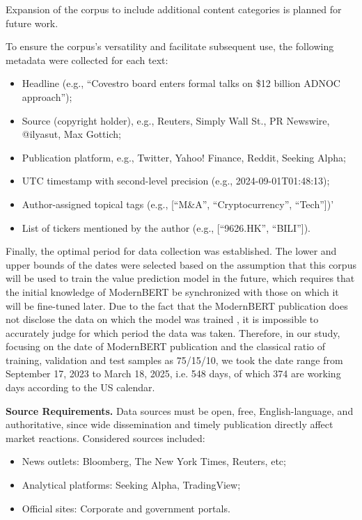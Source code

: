 Expansion of the corpus to include additional content categories is planned for future work.

To ensure the corpus's versatility and facilitate subsequent use, the following metadata were collected for each text:

\begin{itemize}
    \item Headline (e.g., “Covestro board enters formal talks on \$12 billion ADNOC approach”);
    \item Source (copyright holder), e.g., Reuters, Simply Wall St., PR Newswire, @ilyasut, Max Gottich;
    \item Publication platform, e.g., Twitter, Yahoo! Finance, Reddit, Seeking Alpha;
    \item UTC timestamp with second-level precision (e.g., 2024-09-01T01:48:13);
    \item Author-assigned topical tags (e.g., [“M\&A”, “Cryptocurrency”, “Tech”])'
    \item List of tickers mentioned by the author (e.g., [“9626.HK”, “BILI”]).
\end{itemize}

Finally, the optimal period for data collection was established. The lower and upper bounds of the dates were selected
based on the assumption that this corpus will be used to train the value prediction model in the future, which requires
that the initial knowledge of ModernBERT be synchronized with those on which it will be fine-tuned later. Due to the fact
that the ModernBERT publication does not disclose the data on which the model was trained \parencite{Warner2024ModernBERT},
it is impossible to accurately judge for which period the data was taken. Therefore, in our study, focusing
on the date of ModernBERT publication \parencite{Warner2024ModernBERT} and the classical ratio of training,
validation and test samples as 75/15/10, we took the date range from September 17, 2023 to March 18, 2025, i.e. 548 days,
of which 374 are working days according to the US calendar.

\textbf{Source Requirements.} Data sources must be open, free, English-language, and authoritative, since wide
dissemination and timely publication directly affect market reactions. Considered sources included:

\begin{itemize}
    \item News outlets: Bloomberg, The New York Times, Reuters, etc;
    \item Analytical platforms: Seeking Alpha, TradingView;
    \item Official sites: Corporate and government portals.
\end{itemize}


